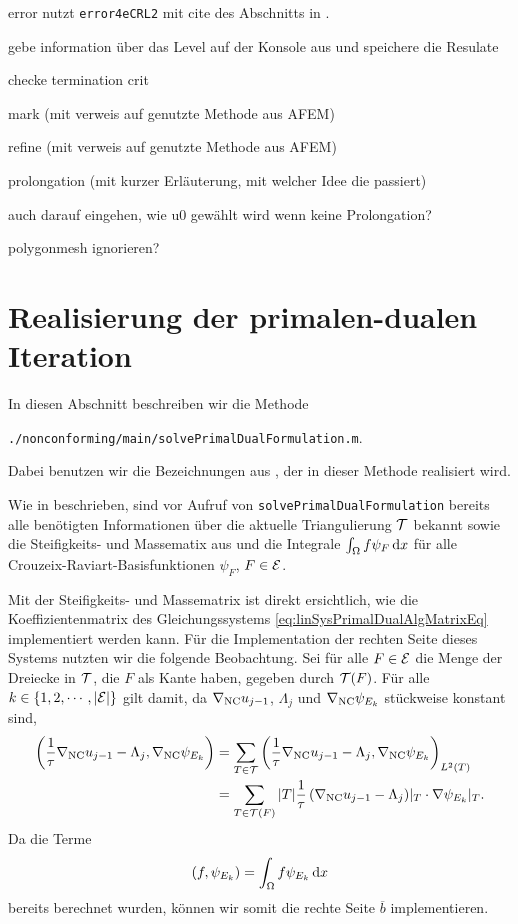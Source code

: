\bigskip error nutzt \texttt{error4eCRL2} mit cite des Abschnitts in
\cite{CGKNRR10}.

\bigskip gebe information über das Level auf der Konsole aus und
speichere die Resulate

\bigskip checke termination crit

\bigskip mark (mit verweis auf genutzte Methode aus AFEM)

\bigskip refine (mit verweis auf genutzte Methode aus AFEM)

\bigskip prolongation (mit kurzer Erläuterung, mit welcher Idee die passiert)

auch darauf eingehen, wie u0 gewählt wird wenn keine Prolongation?

\bigskip polygonmesh ignorieren? 


\section{Realisierung der primalen-dualen Iteration}
\label{sec:implementationPrimalDualIteration}
In diesen Abschnitt beschreiben wir die Methode
\begin{center}
  \texttt{./nonconforming/main/solvePrimalDualFormulation.m}.
\end{center}
Dabei benutzen wir die Bezeichnungen aus , der
in dieser Methode realisiert wird.

Wie in  beschrieben, sind vor Aufruf von
\texttt{solvePrimalDualFormulation} bereits alle benötigten Informationen
über die aktuelle Triangulierung $\mathcal{T}$ bekannt sowie
die Steifigkeits- und Massematix aus  und
die Integrale $\int_\Omega f\psi_F\,\mathrm{d}x$ für alle
Crouzeix-Raviart-Basisfunktionen $\psi_F$, $F\in\mathcal{E}$.

Mit der Steifigkeits- und Massematrix ist direkt ersichtlich,
wie die Koeffizientenmatrix des Gleichungssystems
\eqref{eq:linSysPrimalDualAlgMatrixEq} implementiert werden kann.
Für die Implementation der rechten Seite dieses Systems nutzten wir die
folgende Beobachtung.
Sei für alle $F\in\mathcal{E}$ die Menge der Dreiecke in $\mathcal{T}$, die $F$ als Kante
haben, gegeben durch $\mathcal{T}(F)$. 
Für alle $k\in\{1,2,\cdots,|\mathcal{E}|\}$ gilt damit, da $\nabla_\textup{NC} u_{j-1}$,
$\Lambda_j$ und $\nabla_\textup{NC} \psi_{E_k}$ stückweise konstant sind,
\begin{align*}
  \left(\frac{1}{\tau}\nabla_\textup{NC} u_{j-1}-\Lambda_j,\nabla_\textup{NC}\psi_{E_k}\right)
  &=
  \sum_{T\in\mathcal{T}}
  \left(\frac{1}{\tau}\nabla_\textup{NC} u_{j-1}-\Lambda_j,
  \nabla_\textup{NC}\psi_{E_k}\right)_{L^2(T)}\\
  &=
  \sum_{T\in\mathcal{T}(F)} |T|
  \frac{1}{\tau}\left(\nabla_\textup{NC} u_{j-1}-\Lambda_j\right)\!|_T\cdot
  \nabla\psi_{E_k}|_T.
\end{align*}
Da die Terme
\begin{align*}
  \left(f,\psi_{E_k}\right)=\int_\Omega f\psi_{E_k}\,\mathrm{d}x
\end{align*}
bereits berechnet wurden, können wir somit die rechte Seite $\overline b$
implementieren.

